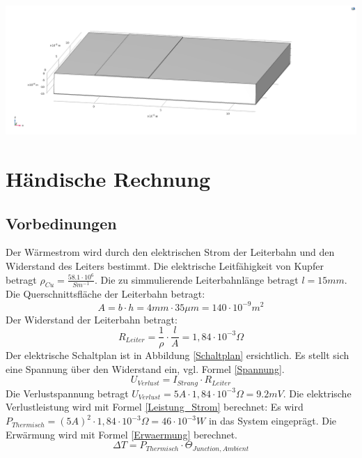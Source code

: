 \documentclass[10pt,a4paper,oneside,abstracton]{scrartcl}
\newenvironment{Figure}
  {\par\medskip\noindent\minipage{\linewidth}}
  {\endminipage\par\medskip}
\begin{document}
\begin{multicols}{2}
\begin{Figure}
	\includegraphics[width=\textwidth]{Bilder/Geometrie.png}
	\label{geometry}
\end{Figure}


\section{Händische Rechnung}
\subsection{Vorbedinungen}
Der Wärmestrom wird durch den elektrischen Strom der Leiterbahn und den Widerstand des Leiters bestimmt. 
\newline
Die elektrische Leitfähigkeit von Kupfer betragt 
\newline
$ \rho_{Cu} = \frac{58.1\cdot 10^6}{Sm^{-1}} $.
\newline
Die zu simmulierende Leiterbahnlänge betragt
\newline
 $l = 15 mm$.
\newline
Die Querschnittsfläche der Leiterbahn betragt: 
\begin{equation}
	A = b \cdot h = 4 mm \cdot 35 \mu m = 140 \cdot 10 ^{-9} m^2
\end{equation}
Der Widerstand der Leiterbahn betragt: 
\begin{equation}
	R_{Leiter} = \frac{1}{\rho} \cdot \frac{l}{A} = 1,84 \cdot 10^{-3} \Omega
\end{equation}
\noindent
Der elektrische Schaltplan ist in Abbildung \ref*{Schaltplan} ersichtlich.  \newline
Es stellt sich eine Spannung über den Widerstand ein, vgl. Formel \ref*{Spannung}. 
\begin{equation}
	U_{Verlust} =  I_{Strang} \cdot R_{Leiter}
	\label{Spannung}
\end{equation}
\noindent
Die Verlustspannung betragt $U_{Verlust} = 5A \cdot 1,84 \cdot 10^{-3} \Omega = 9.2 mV$. 
Die elektrische Verlustleistung wird mit Formel \ref*{Leistung_Strom} berechnet: 
Es wird
$ P_{Thermisch} = (5A)^2 \cdot 1,84 \cdot 10^{-3} \Omega = 46 \cdot 10^{-3} W $ 
in das System eingeprägt.
Die Erwärmung wird mit Formel \ref*{Erwaermung} berechnet.
\begin{equation}
	\Delta T = P_{Thermisch} \cdot \Theta_{Junction, Ambient}
	\label{Erwaermung}
\end{equation}


\end{multicols}
\end{document}

